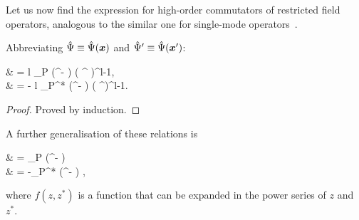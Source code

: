 Let us now find the expression for high-order commutators of restricted field operators, analogous to the similar one for single-mode operators~\cite{Louisell1990}.

\begin{lemma}
	Abbreviating $\hat{\Psi} \equiv \hat{\Psi}(\boldsymbol{x})$ and $\hat{\Psi}^\prime \equiv \hat{\Psi}(\boldsymbol{x}^\prime)$:
	\begin{eqn*}
		& = l \delta_P (\xvec^\prime - \xvec) ( \Psiop^{\prime\dagger} )^{l-1}, \\
		& = - l \delta_P^* (\xvec^\prime - \xvec) ( \Psiop^\prime )^{l-1}.
	\end{eqn*}
\end{lemma}
\begin{proof}
Proved by induction.
\end{proof}

A further generalisation of these relations is

\begin{lemma}
\label{lmm:func-operators:functional-commutators}
	\begin{eqn*}
		& = \delta_P (\xvec^\prime - \xvec) \frac{\partial f}{\partial \Psiop^{\prime\dagger}} \\
		& = -\delta_P^* (\xvec^\prime - \xvec) \frac{\partial f}{\partial \Psiop^\prime},
	\end{eqn*}
	where $f(z, z^*)$ is a function that can be expanded in the power series of $z$ and $z^*$.
\end{lemma}

